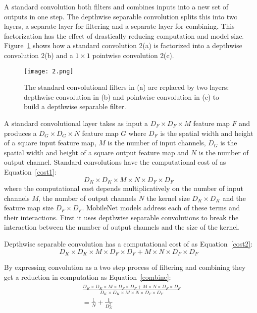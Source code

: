 \documentclass[twocolumn]{article}
\begin{document}
	A standard convolution both filters and combines inputs into a new set of outputs in one step. The depthwise separable convolution splits this into two layers, a separate layer for filtering and a separate layer for combining. This factorization has the effect of drastically reducing computation and model size. Figure~\ref{fig2} shows how a standard convolution 2(a) is factorized into a depthwise convolution 2(b) and a $1\times 1$ pointwise convolution 2(c).
	\begin{figure}[htbp] 
		\centering
		\texttt{[image: 2.png]} 
		\caption{The standard convolutional filters in (a) are replaced by two layers: depthwise convolution in (b) and pointwise convolution in (c) to build a depthwise separable filter.}\label{fig2}  
	\end{figure}

    A standard convolutional layer takes as input a $D_F\times D_F\times M$ feature map $F$ and produces a $D_G\times D_G\times N$ feature map $G$ where $D_F$ is the spatial width and height of a square input feature map, $M$ is the number of input channels, $D_G$ is the spatial width and height of a square output feature map and $N$ is the number of output channel. Standard convolutions have the computational cost of as Equation~\ref{cost1}:
	\begin{equation}
    D_K \times D_K \times M \times N \times D_F \times D_F \label{cost1}
    \end{equation}
	where the computational cost depends multiplicatively on the number of input channels $M$, the number of output channels $N$ the kernel size $D_K\times D_K$ and the feature map size $D_F\times D_F$. MobileNet models address each of these terms and their interactions. First it uses depthwise separable convolutions to break the interaction between the number of output channels and the size of the kernel.
	
	Depthwise separable convolution has a computational cost of as Equation~\ref{cost2}:
	\begin{equation}
	D_K \times D_K \times M \times D_F \times D_F + M \times N \times D_F \times D_F     \label{cost2}
	\end{equation}
	
	By expressing convolution as a two step process of filtering and combining they get a reduction in computation as Equation~\ref{combine}:
	\begin{equation}
	\begin{aligned}
	\begin{split}
	&\frac{D_K \times D_K \times M \times D_F \times D_F + M \times N \times D_F \times D_F}{D_K \times D_K \times M \times N \times D_F \times D_F} \\
	&= \frac{1}{N} + \frac{1}{D_K^2}   \label{combine}
	\end{split}
	\end{aligned}
	\end{equation}
	
\end{document}
